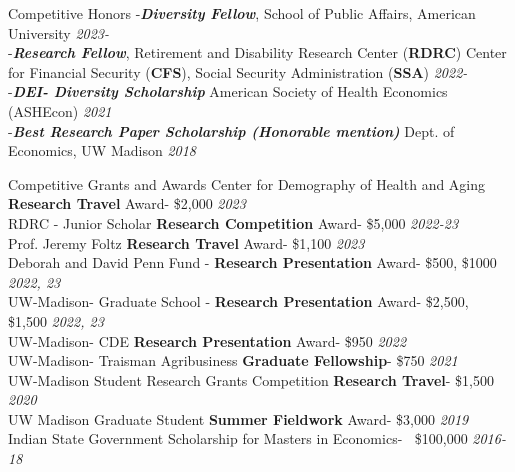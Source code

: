 \documentclass{resume} %
\begin{document}


\begin{rSection}{Competitive Honors}
-\textbf{\textit{Diversity Fellow}}, School of Public Affairs, American University \hfill \textit{2023-} \\
-\textbf{\textit{Research Fellow}}, Retirement and Disability Research Center (\textbf{RDRC}) Center for Financial Security (\textbf{CFS}), Social Security Administration (\textbf{SSA})  \hfill \textit{2022-} \\
-\textbf{\textit{DEI- Diversity Scholarship}} American Society of Health Economics (ASHEcon) \hfill \textit{2021} \\
-\textbf{\textit{Best Research Paper Scholarship (Honorable mention)}} Dept. of Economics, UW Madison \hfill \textit{2018}
\end{rSection}




\begin{rSection}{Competitive Grants and Awards}
Center for Demography of Health and Aging \textbf{Research Travel} Award- \$2,000 \hfill \textit{2023}	\\
RDRC - Junior Scholar \textbf{Research Competition} Award- \$5,000 \hfill \textit{2022-23}	\\
Prof. Jeremy Foltz \textbf{Research Travel} Award- \$1,100 \hfill \textit{2023}	\\
Deborah and David Penn Fund - \textbf{Research Presentation} Award- \$500, \$1000 \hfill \textit{2022, 23}	\\
UW-Madison- Graduate School - \textbf{Research Presentation} Award- \$2,500, \$1,500 \hfill \textit{2022, 23}	\\
UW-Madison- CDE \textbf{Research Presentation} Award- \$950 \hfill \textit{2022} \\
UW-Madison- Traisman Agribusiness \textbf{Graduate Fellowship}- \$750 \hfill \textit{2021}	\\
UW-Madison Student Research Grants Competition \textbf{Research Travel}- \$1,500 \hfill \textit{2020}  \\
UW Madison Graduate Student \textbf{Summer Fieldwork} Award- \$3,000  \hfill \textit{2019}\\
Indian State Government Scholarship for Masters in Economics- $~$ \$100,000 \hfill \textit{2016-18}

\end{rSection}
\end{document}
